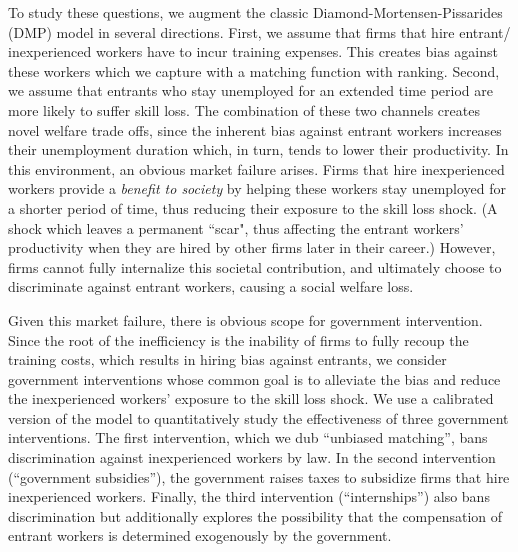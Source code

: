 \documentclass[12pt]{article} %
\theoremstyle{definition}
\begin{document}
To study these questions, we augment the classic Diamond-Mortensen-Pissarides (DMP) model in several directions. First, we assume that firms that hire entrant/ inexperienced workers have to incur training expenses. This creates bias against these workers which we capture with a \cite{petrongolo2001looking} matching function with ranking. Second, we assume that entrants who stay unemployed for an extended time period are more likely to suffer skill loss. The combination of these two channels creates novel welfare trade offs, since the inherent bias against entrant workers increases their unemployment duration which, in turn, tends to lower their productivity. In this environment, an obvious market failure arises. Firms that hire inexperienced workers provide a \textit{benefit to society} by helping these workers stay unemployed for a shorter period of time, thus reducing their exposure to the skill loss shock. (A shock which leaves a permanent ``scar", thus affecting the entrant workers' productivity when they are hired by other firms later in their career.) However, firms cannot fully internalize this societal contribution, and ultimately choose to discriminate against entrant workers, causing a social welfare loss.  


Given this market failure, there is obvious scope for government intervention.
Since the root of the inefficiency is the inability of firms to fully recoup the training costs, which results in hiring bias against entrants, we consider government interventions whose common goal is to alleviate the bias and reduce the inexperienced workers' exposure to the skill loss shock. 
We use a calibrated version of the model to quantitatively study the effectiveness of three government interventions.
The first intervention, which we dub ``unbiased matching'', bans discrimination against inexperienced workers by law.
In the second intervention (``government subsidies''), the government raises taxes to subsidize firms that hire inexperienced workers.
Finally, the third intervention (``internships'') also bans discrimination but additionally explores the possibility that the compensation of entrant workers is determined exogenously by the government.
\end{document}
